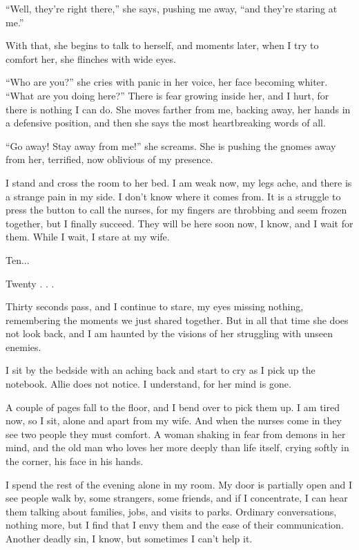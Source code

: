 \documentclass[10pt, twoside, openright]{book}
\begin{document}
``Well, they're right there,'' she says, pushing me away, ``and they're
staring at me.''

With that, she begins to talk to herself, and moments later, when I try
to comfort her, she flinches with wide eyes.

``Who are you?'' she cries with panic in her voice, her face becoming
whiter. ``What are you doing here?'' There is fear growing inside her,
and I hurt, for there is nothing I can do. She moves farther from me,
backing away, her hands in a defensive position, and then she says the
most heartbreaking words of all.

``Go away! Stay away from me!'' she screams. She is pushing the gnomes
away from her, terrified, now oblivious of my presence.

I stand and cross the room to her bed. I am weak now, my legs ache, and
there is a strange pain in my side. I don't know where it comes from. It
is a struggle to press the button to call the nurses, for my fingers are
throbbing and seem frozen together, but I finally succeed. They will be
here soon now, I know, and I wait for them. While I wait, I stare at my
wife.


Ten...

Twenty . . .


Thirty seconds pass, and I continue to stare, my eyes missing nothing,
remembering the moments we just shared together. But in all that time
she does not look back, and I am haunted by the visions of her
struggling with unseen enemies.

I sit by the bedside with an aching back and start to cry as I pick up
the notebook. Allie does not notice. I understand, for her mind is gone.

A couple of pages fall to the floor, and I bend over to pick them up. I
am tired now, so I sit, alone and apart from my wife. And when the
nurses come in they see two people they must comfort. A woman shaking in
fear from demons in her mind, and the old man who loves her more deeply
than life itself, crying softly in the corner, his face in his hands.

I spend the rest of the evening alone in my room. My door is partially
open and I see people walk by, some strangers, some friends, and if I
concentrate, I can hear them talking about families, jobs, and visits to
parks. Ordinary conversations, nothing more, but I find that I envy them
and the ease of their communication. Another deadly sin, I know, but
sometimes I can't help it.
\end{document}
